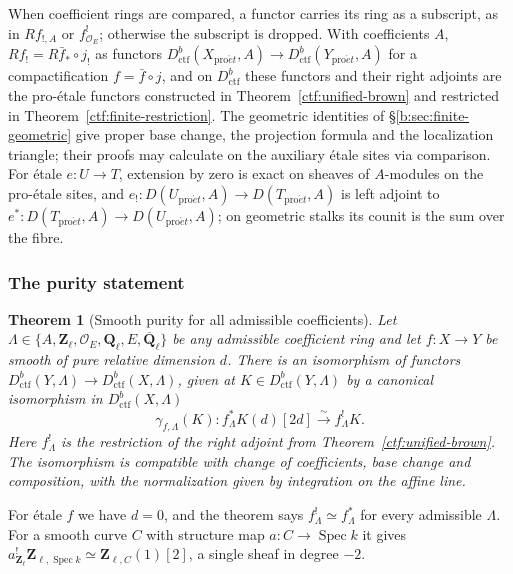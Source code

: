 \documentclass[11pt,a4paper]{article}
\numberwithin{equation}{section}
\newtheorem{theorem}{Theorem}[section]
\theoremstyle{definition}
\theoremstyle{remark}
\newcommand{\Qbar}{\overline{\mathbf Q}_\ell}
\newcommand{\Ql}{\mathbf Q_\ell}
\newcommand{\Zl}{\mathbf Z_\ell}
\newcommand{\proet}{\mathrm{pro}\acute{e}t}
\newcommand{\Dctf}{D^b_{\mathrm{ctf}}}
\begin{document}
When coefficient rings are compared, a functor carries its ring as a
subscript, as in $Rf_{!,A}$ or $f^!_{\mathcal O_E}$; otherwise the
subscript is dropped. With coefficients $A$, $Rf_!=R\bar f_*\circ j_!$ as functors
$\Dctf(X_{\proet},A)\to\Dctf(Y_{\proet},A)$ for
a compactification $f=\bar f\circ j$, and on $\Dctf$ these functors and
their right adjoints are the pro-\'etale functors constructed in
Theorem~\ref{ctf:unified-brown} and restricted in
Theorem~\ref{ctf:finite-restriction}. The geometric identities of
\S\ref{b:sec:finite-geometric} give proper base change, the
projection formula and the localization triangle; their proofs may
calculate on the auxiliary \'etale sites via comparison. For \'etale
$e:U\to T$, extension by zero is exact on sheaves of $A$-modules on the
pro-\'etale sites, and $e_!\colon D(U_{\proet},A)\to D(T_{\proet},A)$ is
left adjoint to $e^*\colon D(T_{\proet},A)\to D(U_{\proet},A)$; on
geometric stalks its counit is the sum over the fibre.

\subsubsection{The purity statement}

\begin{theorem}[Smooth purity for all admissible coefficients]
\label{thm:sp-integral}
Let $\Lambda\in\{A,\Zl,\mathcal O_E,\Ql,E,\Qbar\}$ be any admissible
coefficient ring and let $f:X\to Y$ be smooth of pure relative dimension $d$.
There is an isomorphism of functors
$\Dctf(Y,\Lambda)\to\Dctf(X,\Lambda)$, given at $K\in\Dctf(Y,\Lambda)$
by a canonical isomorphism in $\Dctf(X,\Lambda)$
\begin{equation}\label{eq:sp-main}
 \gamma_{f,\Lambda}(K):
    f_\Lambda^{*}K(d)[2d]\xrightarrow{\sim}f_{\Lambda}^{!}K.
\end{equation}
Here $f^!_\Lambda$ is the restriction of the right adjoint from
Theorem~\ref{ctf:unified-brown}. The isomorphism is compatible with
change of coefficients, base change and composition, with the
normalization given by integration on the affine line.
\end{theorem}

For \'etale $f$ we have $d=0$, and the theorem says
$f_{\Lambda}^{!}\simeq f_\Lambda^{*}$ for every admissible $\Lambda$. For a smooth curve $C$
with structure map $a:C\to\operatorname{Spec}k$ it gives
$a_{\Zl}^!\mathbf Z_{\ell,\operatorname{Spec}k}\simeq\mathbf Z_{\ell,C}(1)[2]$,
a single sheaf in degree $-2$.
\end{document}
